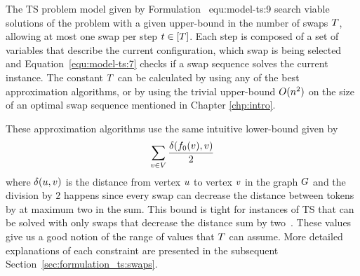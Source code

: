\documentclass[msc,english,table,xcdraw]{ppgccufmg}
\begin{document}

The TS problem model given by Formulation~
{equ:model-ts:9} search viable solutions of the problem with a given 
upper-bound in the number of swaps $T$, allowing at most one swap 
per step $t \in [T]$.
Each step is composed of a set of variables that describe the current 
configuration, which swap is being selected and Equation~\ref{equ:model-ts:7}
checks if a swap sequence solves the current instance.
The constant $T$ can be calculated by using any of the best 
approximation algorithms, or by using the trivial upper-bound $O(
n^{2})$ on the size of an optimal swap sequence mentioned in Chapter
\ref{chp:intro}.


These approximation algorithms use the same intuitive lower-bound given by
$$\sum_{v \in V} \frac{\delta(f_{0}(v), v)}
{2}$$ where $\delta(u, v)$ is the distance from vertex 
$u$ to vertex $v$ in the graph $G$ and the division by $2$ 
happens since every swap can decrease the distance between tokens by at maximum 
two in the sum.
This bound is tight for instances of TS that can be solved with only swaps
that decrease the distance sum by two~\citep{Bonnet:2018}.
These values give us a good notion of the range of values that $T$ can
assume.
More detailed explanations of each constraint are presented in the subsequent  
Section~\ref{sec:formulation_ts:swaps}.


\end{document}

